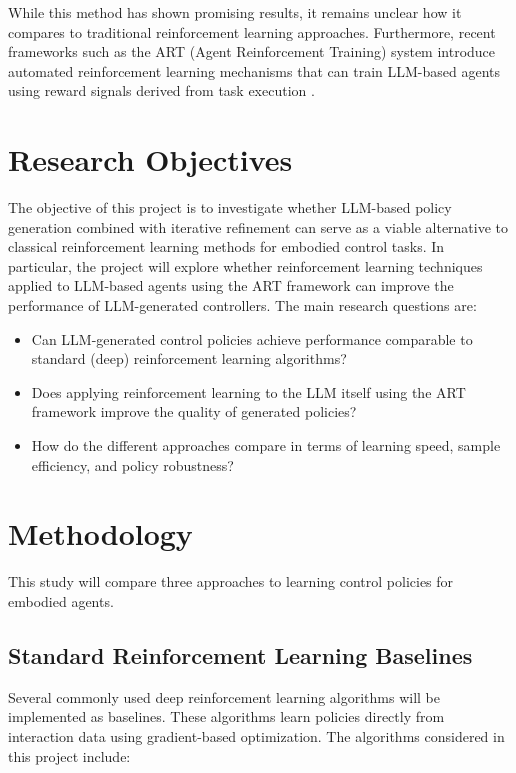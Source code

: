 \documentclass[12pt]{article}
\begin{document}
While this method has shown promising results, it remains unclear how it compares to traditional reinforcement learning approaches. Furthermore, recent frameworks such as the ART (Agent Reinforcement Training) system introduce automated reinforcement learning mechanisms that can train LLM-based agents using reward signals derived from task execution \parencite{OpenPipeARTAutorl}.

\section{Research Objectives}
The objective of this project is to investigate whether LLM-based policy generation combined with iterative refinement can serve as a viable alternative to classical reinforcement learning methods for embodied control tasks. In particular, the project will explore whether reinforcement learning techniques applied to LLM-based agents using the ART framework can improve the performance of LLM-generated controllers. The main research questions are:

\begin{itemize}
\item Can LLM-generated control policies achieve performance comparable to standard (deep) reinforcement learning algorithms?
\item Does applying reinforcement learning to the LLM itself using the ART framework improve the quality of generated policies?
\item How do the different approaches compare in terms of learning speed, sample efficiency, and policy robustness?
\end{itemize}

\section{Methodology}

This study will compare three approaches to learning control policies for embodied agents.

\subsection{Standard Reinforcement Learning Baselines}

Several commonly used deep reinforcement learning algorithms will be implemented as baselines. These algorithms learn policies directly from interaction data using gradient-based optimization. The algorithms considered in this project include:
\end{document}
